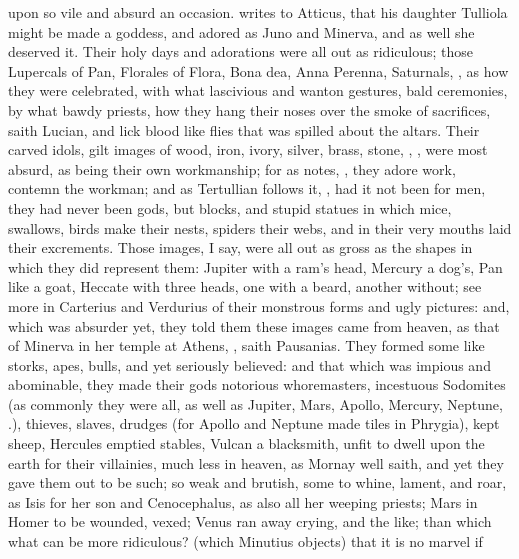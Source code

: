 {upon so vile and absurd an occasion. \Tully writes to Atticus, that his
daughter Tulliola might be made a goddess, and adored as Juno and
Minerva, and as well she deserved it. Their holy days and adorations
were all out as ridiculous; those Lupercals of Pan, Florales of Flora,
Bona dea, Anna Perenna, Saturnals, \etc{}, as how they were celebrated,
with what lascivious and wanton gestures, bald ceremonies, by
what bawdy priests, how they hang their noses over the smoke of
sacrifices, saith Lucian, and lick blood like flies that was
spilled about the altars. Their carved idols, gilt images of wood,
iron, ivory, silver, brass, stone, , \etc{}, were most
absurd, as being their own workmanship; for as \Seneca notes, , they adore
work, contemn the workman; and as Tertullian follows it, , had it not been for men, they had
never been gods, but blocks, and stupid statues in which mice,
swallows, birds make their nests, spiders their webs, and in their very
mouths laid their excrements. Those images, I say, were all out as
gross as the shapes in which they did represent them: Jupiter with a
ram's head, Mercury a dog's, Pan like a goat, Heccate with three heads,
one with a beard, another without; see more in Carterius and
Verdurius of their monstrous forms and ugly pictures: and, which
was absurder yet, they told them these images came from heaven, as that
of Minerva in her temple at Athens, , saith Pausanias. They formed some like storks, apes, bulls,
and yet seriously believed: and that which was impious and abominable,
they made their gods notorious whoremasters, incestuous Sodomites (as
commonly they were all, as well as Jupiter, Mars, Apollo, Mercury,
Neptune, \etc{}.), thieves, slaves, drudges (for Apollo and Neptune made
tiles in Phrygia), kept sheep, Hercules emptied stables, Vulcan a
blacksmith, unfit to dwell upon the earth for their villainies, much
less in heaven, as Mornay well saith, and yet they gave them out
to be such; so weak and brutish, some to whine, lament, and roar, as
Isis for her son and Cenocephalus, as also all her weeping priests;
Mars in Homer to be wounded, vexed; Venus ran away crying, and the
like; than which what can be more ridiculous?  (which Minutius objects)  that it is no marvel if
}
